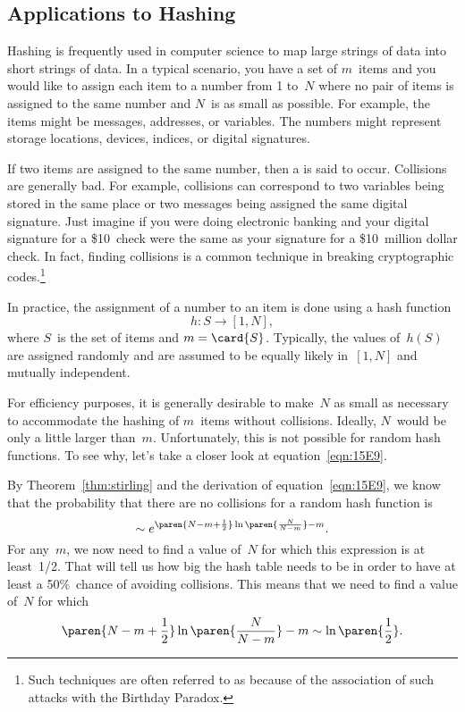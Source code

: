 \subsection{Applications to Hashing}

Hashing is frequently used in computer science to map large strings of
data into short strings of data.  In a typical scenario, you have a
set of $m$~items and you would like to assign each item to a number
from 1 to~$N$ where no pair of items is assigned to the same number
and $N$~is as small as possible.  For example, the items might be
messages, addresses, or variables.  The numbers might represent
storage locations, devices, indices, or digital signatures.

If two items are assigned to the same number, then a 
is said to occur.  Collisions are generally bad.  For example,
collisions can correspond to two variables being stored in the same
place or two messages being assigned the same digital signature.  Just
imagine if you were doing electronic banking and your digital
signature for a \$10~check were the same as your signature for a
\$10~million dollar check.  In fact, finding collisions is a common
technique in breaking cryptographic codes.\footnote{Such techniques
  are often referred to as  because of the
  association of such attacks with the Birthday Paradox.}

In practice, the assignment of a number to an item is done using a
hash function
\begin{equation*}
    h: S \to [1, N],
\end{equation*}
where $S$~is the set of items and $m = \card{S}$.  Typically, the
values of~$h(S)$ are assigned randomly and are assumed to be equally
likely in~$[1, N]$ and mutually independent.

For efficiency purposes, it is generally desirable to make~$N$ as
small as necessary to accommodate the hashing of $m$~items without
collisions.  Ideally, $N$~would be only a little larger than~$m$.
Unfortunately, this is not possible for random hash functions.  To see
why, let's take a closer look at equation~\eqref{eqn:15E9}.

By Theorem~\ref{thm:stirling} and the derivation of
equation~\eqref{eqn:15E9}, we know that the probability that there are
no collisions for a random hash function is
\begin{equation}\label{eqn:16K}
    \sim e^{ \paren{N - m + \frac{1}{2}} \ln\paren{\frac{N}{N - m}} - m }.
\end{equation}
For any~$m$, we now need to find a value of~$N$ for which this
expression is at least~1/2.  That will tell us how big the hash table
needs to be in order to have at least a 50\%~chance of avoiding
collisions.  This means that we need to find a value of~$N$ for which
\begin{equation}\label{eqn:16P}
    \paren{N - m + \frac{1}{2}} \ln\paren{\frac{N}{N - m}} - m 
        \sim
    \ln\paren{\frac{1}{2}}.
\end{equation}

